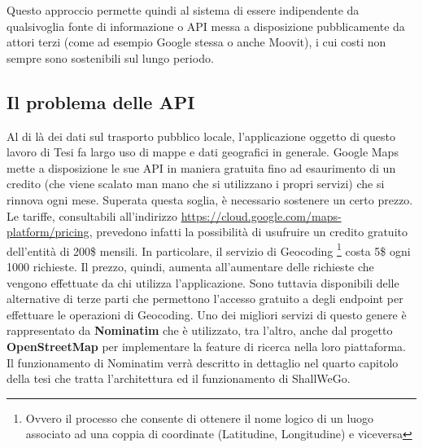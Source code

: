         Questo approccio permette quindi al sistema di essere indipendente da qualsivoglia fonte di informazione o API messa a disposizione pubblicamente da attori terzi (come ad esempio Google stessa o anche Moovit), i cui costi non sempre sono sostenibili sul lungo periodo.

        \subsection{Il problema delle API}
        Al di là dei dati sul trasporto pubblico locale, l'applicazione oggetto di questo lavoro di Tesi fa largo uso di mappe e dati geografici in generale. Google Maps mette a disposizione le sue API in maniera gratuita fino ad esaurimento di un credito (che viene scalato man mano che si utilizzano i propri servizi) che si rinnova ogni mese. Superata questa soglia, è necessario sostenere un certo prezzo.
        Le tariffe, consultabili all'indirizzo \url{https://cloud.google.com/maps-platform/pricing}, prevedono infatti la possibilità di usufruire un credito gratuito dell'entità di 200\$ mensili. In particolare, il servizio di Geocoding \footnote[1]{Ovvero il processo che consente di ottenere il nome logico di un luogo associato ad una coppia di coordinate (Latitudine, Longitudine) e viceversa} costa 5\$ ogni 1000 richieste. Il prezzo, quindi, aumenta all'aumentare delle richieste che vengono effettuate da chi utilizza l'applicazione.
        Sono tuttavia disponibili delle alternative di terze parti che permettono l'accesso gratuito a degli endpoint per effettuare le operazioni di Geocoding. Uno dei migliori servizi di questo genere è rappresentato da \textbf{Nominatim} che è utilizzato, tra l'altro, anche dal progetto \textbf{OpenStreetMap} per implementare la feature di ricerca nella loro piattaforma. Il funzionamento di Nominatim verrà descritto in dettaglio nel quarto capitolo della tesi che tratta l'architettura ed il funzionamento di ShallWeGo.
        
        \newpage

